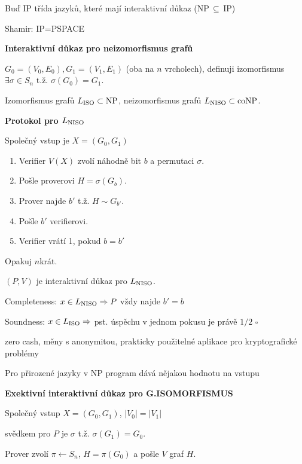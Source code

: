 \documentclass[a4paper,12pt,titlepage]{article}
\def\podnadpis#1{{\bigskip\bf\noindent#1\medskip\par}}
\def\tvrzeni{\medskip\noindent {\bf Tvrzení: }}
\def\dukaz{\noindent {\bf Důkaz: }}
\def\qed{{\hfill{$\square$}}}
\begin{document}
Buď IP třída jazyků, které mají interaktivní důkaz (NP$\,\subseteq\,$IP)

Shamir: IP=PSPACE

\podnadpis{Interaktivní důkaz pro neizomorfismus grafů}

$G_0=(V_0,E_0), G_1=(V_1,E_1)$ (oba na $n$ vrcholech), definuji izomorfismus $\exists \sigma\in S_n$ t.ž. $\sigma(G_0)=G_1$.

Izomorfismus grafů $L_{\rm ISO}\subset\rm NP$, neizomorfismus grafů $L_{\rm NISO}\subset\rm coNP$.

\podnadpis{Protokol pro $L_{\rm NISO}$}

Společný vstup je $X=(G_0,G_1)$

\begin{enumerate}

\item Verifier $V(X)$ zvolí náhodně bit $b$ a permutaci $\sigma$.

\item Pošle proverovi $H=\sigma(G_b)$.

\item Prover najde $b'$ t.ž. $H\sim G_{b'}$.

\item Pošle $b'$ verifierovi.

\item Verifier vrátí 1, pokud $b=b'$

\end{enumerate}

Opakuj $n$krát.

\tvrzeni $(P,V)$ je interaktivní důkaz pro $L_{\rm NISO}$.

\dukaz Completeness: $x\in L_{\rm NISO} \Rightarrow P$ vždy najde $b'=b$

\noindent Soundness: $x\in L_{\rm ISO} \Rightarrow$ pst. úspěchu v jednom pokusu je právě $1/2$ \qed
\medskip

 zero cash, měny s anonymitou, prakticky použitelné aplikace pro kryptografické problémy
\smallskip

Pro přirozené jazyky v NP program dává nějakou hodnotu na vstupu%

\podnadpis{Exektivní interaktivní důkaz pro G.ISOMORFISMUS}

Společný vstup $X=(G_0,G_1)$, $|V_0|=|V_1|$

svědkem pro $P$ je $\sigma$ t.ž. $\sigma(G_1)=G_0$.

Prover zvolí $\pi\leftarrow S_n$, $H=\pi(G_0)$ a pošle $V$ graf $H$.
\end{document}
